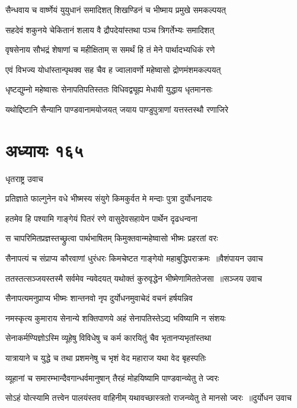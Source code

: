 \twolineshloka
{सैन्धवाय च वार्ष्णेयं युयुधानं समादिशत्}
{शिखण्डिनं च भीष्माय प्रमुखे समकल्पयत्}


\twolineshloka
{सहदेवं शकुनये चेकितानं शलाय वै}
{द्रौपदेयांस्तथा पञ्च त्रिगर्तेभ्यः समादिशत्}


\twolineshloka
{वृषसेनाय सौभद्रं शेषाणां च महीक्षिताम्}
{स समर्थं हि तं मेने पार्थादभ्यधिकं रणे}


\twolineshloka
{एवं विभज्य योधांस्तान्पृथक्व सह चैव ह}
{ज्वालावर्णो महेष्वासो द्रोणमंशमकल्पयत्}


\twolineshloka
{धृष्टद्युम्नो महेष्वासः सेनापतिपतिस्ततः}
{विधिवद्व्यूह्य मेधावी युद्धाय धृतमानसः}


\twolineshloka
{यथोद्दिष्टानि सैन्यानि पाण्डवानामयोजयत्}
{जयाय पाण्डुपुत्राणां यत्तस्तस्थौ रणाजिरे}


\chapter{अध्यायः १६५}
\twolineshloka
{धृतराष्ट्र उवाच}
{}


\twolineshloka
{प्रतिज्ञाते फाल्गुनेन वधे भीष्मस्य संयुगे}
{किमकुर्वत मे मन्दाः पुत्रा दुर्योधनादयः}


\twolineshloka
{हतमेव हि पश्यामि गाङ्गेयं पितरं रणे}
{वासुदेवसहायेन पार्थेन दृढधन्वना}


\twolineshloka
{स चापरिमितप्रज्ञस्तच्छ्रुत्वा पार्थभाषितम्}
{किमुक्तवान्महेष्वासो भीष्मः प्रहरतां वरः}


\threelineshloka
{सैनापत्यं च संप्राप्य कौरवाणां धुरंधरः}
{किमचेष्टत गाङ्गेयो महाबुद्धिपराक्रमः ॥वैशंपायन उवाच}
{}


\threelineshloka
{ततस्तत्सञ्जयस्तस्मै सर्वमेव न्यवेदयत्}
{यथोक्तं कुरुवृद्धेन भीष्मेणामिततेजसा ॥सञ्जय उवाच}
{}


\twolineshloka
{सैनापत्यमनुप्राप्य भीष्मः शान्तनवो नृप}
{दुर्योधनमुवाचेदं वचनं हर्षयन्निव}


\threelineshloka
{नमस्कृत्य कुमाराय सेनान्ये शक्तिपाणये}
{अहं सेनापतिस्तेऽद्य भविष्यामि न संशयः}
{}


\twolineshloka
{सेनाकर्मण्यिज्ञोऽस्मि व्यूहेषु विविधेषु च}
{कर्म कारयितुं चैव भृतानप्यभृतांस्तथा}


\twolineshloka
{यात्रायाने च युद्धे च तथा प्रशमनेषु च}
{भृशं वेद महाराज यथा वेद बृहस्पतिः}


\twolineshloka
{व्यूहानां च समारम्भान्दैवगान्धर्वमानुषान्}
{तैरहं मोहयिष्यामि पाण्डवान्व्येतु ते ज्वरः}


\threelineshloka
{सोऽहं योत्स्यामि तत्त्वेन पालयंस्तव वाहिनीम्}
{यथावच्छास्त्रतो राजन्व्येतु ते मानसो ज्वरः ॥दुर्योधन उवाच}
{}


